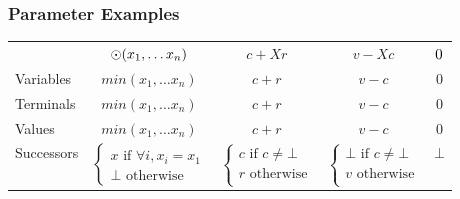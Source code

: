 \documentclass[english]{beamer}
\begin{document}
\begin{frame}
  \frametitle{Parameter Examples}
  \begin{center}
  \begin{tabular}{lcccc}
    & $\common{X} (x_1, \dots x_n)$
    & $c \plus{X} r$
    & $v \minus{X} c$
    & $\zero{X}$
    \\
    Variables
    & $\mathit{min} (x_1, \dots x_n)$
    & $c + r$
    & $v - c$
    & $0$
    \\
    Terminals
    & $\mathit{min} (x_1, \dots x_n)$
    & $c + r$
    & $v - c$
    & $0$
    \\
    Values
    & $\mathit{min} (x_1, \dots x_n)$
    & $c + r$
    & $v - c$
    & $0$
    \\
    Successors
    & $\begin{cases}
       x \text{ if } \forall i, x_i = x_1 \\
       \bot \text{ otherwise}
       \end{cases}$
    & $\begin{cases}
       c \text{ if } c \neq \bot \\
       r \text{ otherwise} \\
       \end{cases}$
    & $\begin{cases}
       \bot \text{ if } c \neq \bot \\
       v    \text{ otherwise} \\
       \end{cases}$
    & $\bot$
    \\
  \end{tabular}
  \end{center}
\end{frame}
\end{document}
